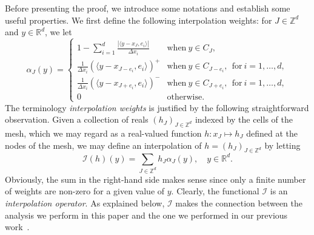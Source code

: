 \documentclass[11pt]{article}
\theoremstyle{definition}
\numberwithin{equation}{section}
\newcommand*\RR{\mathbb{R}}
\newcommand*\ZZ{\mathbb{Z}}
\begin{document}
Before presenting the proof, we introduce some notations and establish some useful properties. We first define the following interpolation weights: for $J\in\ZZ^d$ and $y \in \RR^d$, we let
\begin{equation}\label{def:alpha}
\alpha_J(y) = 
\begin{cases}
 1-\sum_{i=1}^d \frac{|\langle y-{x_J},e_i\rangle|}{\Delta x_i} & \text{when} \ y\in C_J,
\\[0.25em]
 \frac{1}{\Delta x_i}(\langle y-x_{J-e_i},e_i\rangle)^+ &\text{when} \ y\in C_{J-e_i}, \ \ \text{for} \ i= 1,\dots,d,
\\[0.25em]
 \frac{1}{\Delta x_i}(\langle y-x_{J+e_i},e_i\rangle)^- &\text{when} \ y\in C_{J+e_i}, \ \ \text{for} \ i=1,\dots,d,
\\[0.25em]
0 &\text{otherwise}.
\end{cases}
\end{equation}
The terminology \emph{interpolation weights} is justified by the following straightforward observation. Given a collection of reals $(h_{J})_{J \in {\mathbb Z}^d}$ indexed by the cells of the mesh, which we may regard as a real-valued function $h : x_{J} \mapsto h_{J}$ defined at the nodes of the mesh, we may define an interpolation of $h=(h_{J})_{J \in {\mathbb Z}^d}$ by letting
\begin{equation}\label{eq:matchalI}
{\mathcal I}(h)(y) = \sum_{J \in {\mathbb Z}^d} h_{J} \alpha_{J}(y), \quad y \in \RR^d.
\end{equation}
Obviously, the sum in the right-hand side makes sense since only a finite number of weights are non-zero for a given value of $y$. Clearly, the functional ${\mathcal I}$ is an \emph{interpolation operator}. As explained below, ${\mathcal I}$ makes the connection between the analysis we perform in this paper and the one we performed in our previous work~\cite{DLV}.
\end{document}
